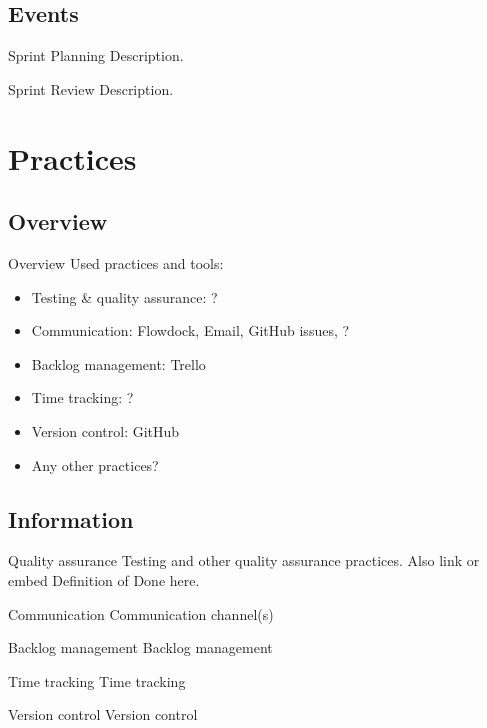 \documentclass{beamer}
\begin{document}
\subsection{Events}
\begin{frame}{Sprint Planning}
  Description.
\end{frame}
\begin{frame}{Sprint Review}
  Description.
\end{frame}
\section{Practices}
\subsection{Overview}
\begin{frame}{Overview}
  Used practices and tools:
  \begin{itemize}
  \item Testing \& quality assurance: ?
  \item Communication: Flowdock, Email, GitHub issues, ?
  \item Backlog management: Trello
  \item Time tracking: ?
  \item Version control: GitHub
  \item Any other practices?
  \end{itemize}
\end{frame}
\subsection{Information}
\begin{frame}{Quality assurance}
  Testing and other quality assurance practices. Also link or embed Definition
  of Done here.
\end{frame}
\begin{frame}{Communication}
  Communication channel(s)
\end{frame}
\begin{frame}{Backlog management}
  Backlog management
\end{frame}
\begin{frame}{Time tracking}
  Time tracking
\end{frame}
\begin{frame}{Version control}
  Version control
\end{frame}
\end{document}
